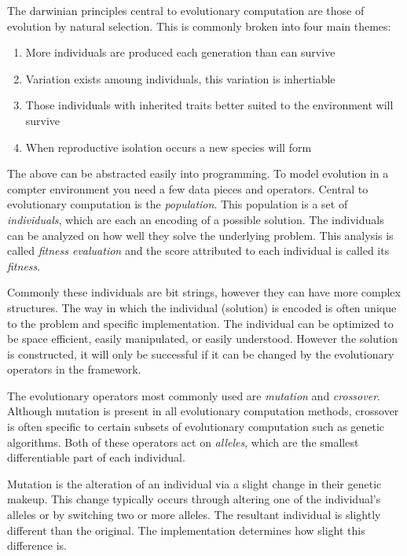 \documentclass[10pt,letterpaper]{article}
\begin{document}
The darwinian principles central to evolutionary computation are those of evolution by natural selection. This is commonly broken into four main themes:
\begin{enumerate}
\item More individuals are produced each generation than can survive
\item Variation exists amoung individuals, this variation is inhertiable
\item Those individuals with inherited traits better suited to the environment will survive
\item When reproductive isolation occurs a new species will form
\end{enumerate}


The above can be abstracted easily into programming. To model evolution in a compter environment you need a few data pieces and operators. Central to evolutionary computation is the \textit{population}. This population is a set of \textit{individuals}, which are each an encoding of a possible solution. The individuals can be analyzed on how well they solve the underlying problem. This analysis is called \textit{fitness evaluation} and the score attributed to each individual is called its \textit{fitness}.

Commonly these individuals are bit strings, however they can have more complex structures. The way in which the individual (solution) is encoded is often unique to the problem and specific implementation. The individual can be optimized to be space efficient, easily manipulated, or easily understood. However the solution is constructed, it will only be successful if it can be changed by the evolutionary operators in the framework. 

The evolutionary operators most commonly used are \textit{mutation} and \textit{crossover}. Although mutation is present in all evolutionary computation methods, crossover is often specific to certain subsets of evolutionary computation such as genetic algorithms. Both of these operators act on \textit{alleles}, which are the smallest differentiable part of each individual. %

Mutation is the alteration of an individual via a slight change in their genetic makeup. This change typically occurs through altering one of the individual's alleles or by switching two or more alleles. The resultant individual is slightly different than the original. The implementation determines how slight this difference is.
\end{document}
